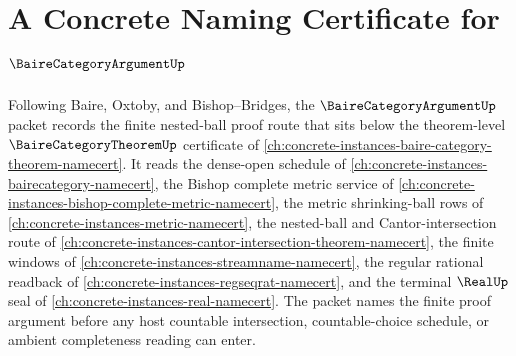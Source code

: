 \chapter{A Concrete Naming Certificate for $\BaireCategoryArgumentUp$}
\label{ch:concrete-instances-baire-category-argument-namecert}

Following Baire, Oxtoby, and Bishop--Bridges, the $\BaireCategoryArgumentUp$ packet records the finite nested-ball proof route that sits below the theorem-level $\BaireCategoryTheoremUp$ certificate of \autoref{ch:concrete-instances-baire-category-theorem-namecert}. It reads the dense-open schedule of \autoref{ch:concrete-instances-bairecategory-namecert}, the Bishop complete metric service of \autoref{ch:concrete-instances-bishop-complete-metric-namecert}, the metric shrinking-ball rows of \autoref{ch:concrete-instances-metric-namecert}, the nested-ball and Cantor-intersection route of \autoref{ch:concrete-instances-cantor-intersection-theorem-namecert}, the finite windows of \autoref{ch:concrete-instances-streamname-namecert}, the regular rational readback of \autoref{ch:concrete-instances-regseqrat-namecert}, and the terminal $\RealUp$ seal of \autoref{ch:concrete-instances-real-namecert}. The packet names the finite proof argument before any host countable intersection, countable-choice schedule, or ambient completeness reading can enter.

